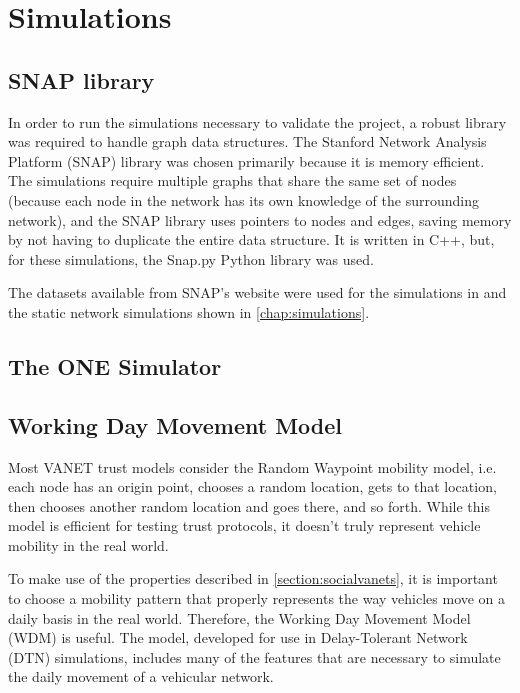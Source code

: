 \chapter{Simulations}
\label{chap:simulations}

\section{SNAP library}
\label{section:snap}
In order to run the simulations necessary to validate the project, a robust library was required to handle graph data structures.
The Stanford Network Analysis Platform (SNAP) library \cite{snap} was chosen primarily because it is memory efficient.
The simulations require multiple graphs that share the same set of nodes (because each node in the network has its own knowledge of the surrounding network), and the SNAP library uses pointers to nodes and edges, saving memory by not having to duplicate the entire data structure.
It is written in C++, but, for these simulations, the Snap.py Python library was used.

The datasets available from SNAP's website were used for the simulations in \cite{vernize2015malicious} and the static network simulations shown in \autoref{chap:simulations}.

\section{The ONE Simulator}
\label{section:theone}

\section{Working Day Movement Model}
\label{section:workingday}

Most VANET trust models consider the Random Waypoint mobility model, i.e. each node has an origin point, chooses a random location, gets to that location, then chooses another random location and goes there, and so forth.
While this model is efficient for testing trust protocols, it doesn't truly represent vehicle mobility in the real world.

To make use of the properties described in \autoref{section:socialvanets}, it is important to choose a mobility pattern that properly represents the way vehicles move on a daily basis in the real world.
Therefore, the Working Day Movement Model \cite{ekman2008working} (WDM) is useful.
The model, developed for use in Delay-Tolerant Network (DTN) simulations, includes many of the features that are necessary to simulate the daily movement of a vehicular network.

